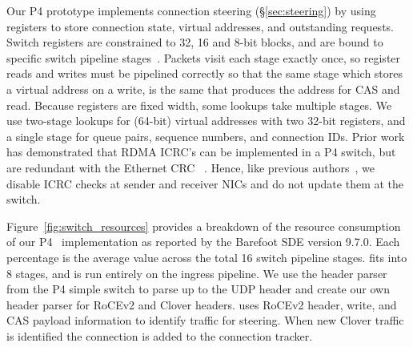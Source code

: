 Our P4 prototype implements connection steering (\S\ref{sec:steering})
by using registers to
store connection state, virtual addresses, and outstanding
requests. Switch registers are constrained to 32, 16 and 8-bit blocks,
and are bound to specific switch pipeline
stages~\cite{netcache}. Packets visit each stage exactly once, so
register reads and writes must be pipelined correctly so that the same
stage which stores a virtual address on a write, is the same that
produces the address for CAS and read. Because registers are fixed
width, some lookups take multiple stages.  We use two-stage lookups
for (64-bit) virtual addresses with two 32-bit registers, and a single
stage for queue pairs, sequence numbers, and connection IDs.
Prior work has demonstrated that RDMA ICRC's can be implemented in a
P4 switch, but are redundant with the Ethernet CRC
~\cite{p4telemetry,bedrock}.  Hence, like previous
authors~\cite{switchml}, we disable ICRC checks at sender and receiver
NICs and do not update them at the switch.


Figure~\ref{fig:switch_resources} provides a breakdown of
the resource consumption of our P4 \sword\ implementation as
reported by
the Barefoot SDE version 9.7.0. Each percentage is
the average value across the total 16 switch pipeline
stages. {\sword} fits into 8 stages, and is run entirely on
the ingress pipeline.
We use the header parser from the P4 simple switch to parse up to the
UDP header and create our own header parser for RoCEv2 and Clover
headers.  {\sword} uses RoCEv2 header, write, and CAS payload
information to identify traffic for steering. When new Clover traffic is
identified the connection is added to the connection tracker.


